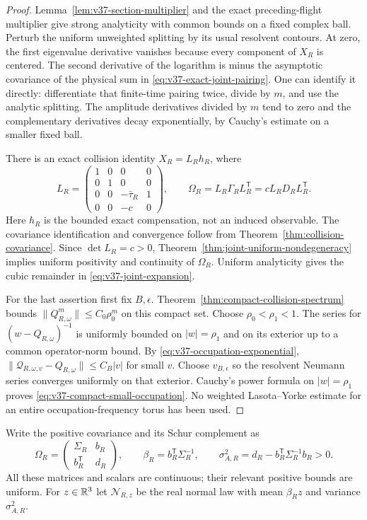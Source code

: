 \begin{proof}
Lemma~\ref{lem:v37-section-multiplier} and the exact preceding-flight
multiplier give strong analyticity with common bounds on a fixed
complex ball. Perturb the uniform unweighted splitting by its usual
resolvent contours. At zero, the first eigenvalue derivative vanishes
because every component of $X_R$ is centered. The second derivative
of the logarithm is minus the asymptotic covariance of the physical
sum in \eqref{eq:v37-exact-joint-pairing}. One can identify it directly:
differentiate that finite-time pairing twice, divide by $m$, and use
the analytic splitting. The amplitude derivatives divided by $m$ tend
to zero and the complementary derivatives decay exponentially, by
Cauchy's estimate on a smaller fixed ball.

There is an exact collision identity $X_R=L_Rh_R$, where
\begin{equation}\label{eq:v37-covariance-change}
 L_R=\begin{pmatrix}
 1&0&0&0\\0&1&0&0\\0&0&-\bar\tau_R&1\\0&0&-c&0
 \end{pmatrix},\qquad
 \Omega_R=L_R\Gamma_RL_R^{\mathsf T}=cL_RD_RL_R^{\mathsf T}.
\end{equation}
Here $h_R$ is the bounded exact compensation, not an induced observable.
The covariance identification and convergence follow from
Theorem~\ref{thm:collision-covariance}. Since $\det L_R=c>0$,
Theorem~\ref{thm:joint-uniform-nondegeneracy} implies uniform positivity
and continuity of $\Omega_R$. Uniform analyticity gives the cubic
remainder in \eqref{eq:v37-joint-expansion}.

For the last assertion first fix $B,\epsilon$. Theorem~\ref{thm:compact-collision-spectrum}
bounds $\|Q_{R,\omega}^m\|\le C_0\rho_0^m$ on this compact set.
Choose $\rho_0<\rho_1<1$. The series for
$(w-Q_{R,\omega})^{-1}$ is uniformly bounded on $|w|=\rho_1$
and on its exterior up to a common operator-norm bound. By
\eqref{eq:v37-occupation-exponential},
$\|\mathcal Q_{R,\omega,v}-Q_{R,\omega}\|\le C_B|v|$ for small $v$.
Choose $v_{B,\epsilon}$ so the resolvent Neumann series converges
uniformly on that exterior. Cauchy's power formula on $|w|=\rho_1$
proves \eqref{eq:v37-compact-small-occupation}. No weighted
Lasota--Yorke estimate for an entire occupation-frequency torus has
been used.
\end{proof}

Write the positive covariance and its Schur complement as
\begin{equation}\label{eq:v37-schur-data}
 \Omega_R=\begin{pmatrix}\Sigma_R&b_R\\b_R^{\mathsf T}&d_R\end{pmatrix},
 \qquad \beta_R=b_R^{\mathsf T}\Sigma_R^{-1},\qquad
 \sigma_{A,R}^2=d_R-b_R^{\mathsf T}\Sigma_R^{-1}b_R>0.
\end{equation}
All these matrices and scalars are continuous; their relevant positive
bounds are uniform. For $z\in\mathbb R^3$ let $\mathcal N_{R,z}$ be the real
normal law with mean $\beta_Rz$ and variance $\sigma_{A,R}^2$.


